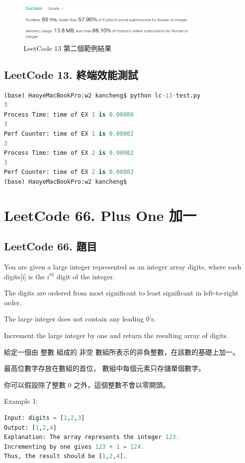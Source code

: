\documentclass[10pt,UTF8]{ctexart}
\begin{document}
\begin{figure}[H]
\centering 
\includegraphics[width=0.80\textwidth]{lc-13-2.png} 
\caption{LeetCode 13 第二個範例結果}
\label{Test}
\end{figure}

\subsection{LeetCode 13. 終端效能測試}

\begin{lstlisting}[language={python}]
(base) HaoyeMacBookPro:w2 kancheng$ python lc-13-test.py 
3
Process Time: time of EX 1 is 0.00008
3
Perf Counter: time of EX 1 is 0.00002
3
Process Time: time of EX 2 is 0.00002
3
Perf Counter: time of EX 2 is 0.00002
(base) HaoyeMacBookPro:w2 kancheng$ 
\end{lstlisting}

\newpage

\section{LeetCode 66. Plus One 加一}

\subsection{LeetCode 66. 題目}

You are given a large integer represented as an integer array digits, where each digits[i] is the $i^{th}$ digit of the integer. 

The digits are ordered from most significant to least significant in left-to-right order. 

The large integer does not contain any leading 0's.

Increment the large integer by one and return the resulting array of digits.

給定一個由 整數 組成的 非空 數組所表示的非負整數，在該數的基礎上加一。

最高位數字存放在數組的首位， 數組中每個元素只存儲單個數字。

你可以假設除了整數 0 之外，這個整數不會以零開頭。

Example 1:
\begin{lstlisting}[language={python}]
Input: digits = [1,2,3]
Output: [1,2,4]
Explanation: The array represents the integer 123.
Incrementing by one gives 123 + 1 = 124.
Thus, the result should be [1,2,4].
\end{lstlisting}
\end{document}
